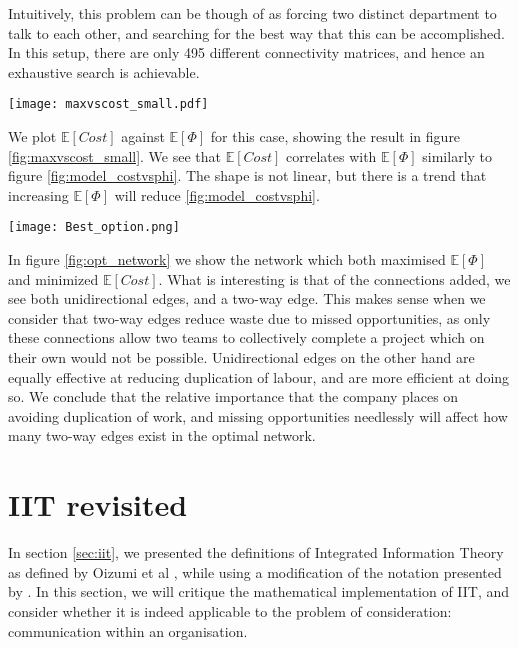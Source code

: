 Intuitively, this problem can be though of as forcing two distinct department to talk to each other, and searching for the best way that this can be accomplished. In this setup, there are only 495 different connectivity matrices, and hence an exhaustive search is achievable.



\begin{SCfigure}
	\centering
	\texttt{[image: maxvscost\_small.pdf]}
	\caption{We plot  $\mathbb{E}[Cost]$ against $\mathbb{E}[\Phi]$ for connectivity matrices where we add 4 directed edges to the network shown in figure \ref{fig:diagram2}}
	\label{fig:maxvscost_small}
\end{SCfigure}

We plot $\mathbb{E}[Cost]$ against $\mathbb{E}[\Phi]$ for this case, showing the result in figure \ref{fig:maxvscost_small}. We see that $\mathbb{E}[Cost]$ correlates with $\mathbb{E}[\Phi]$ similarly to figure \ref{fig:model_costvsphi}. The shape is not linear, but there is a trend that increasing $\mathbb{E}[\Phi]$ will reduce \ref{fig:model_costvsphi}.

\begin{SCfigure}
	\centering
	\texttt{[image: Best\_option.png]}
	\caption{We show the network which generated both the smallest $\mathbb{E}[Cost]$, and the largest $\mathbb{E}[\Phi]$. The two way link between $B$ and $D$ allows the network to have one combination of teams which can complete the project requiring all skills. The other one way links from $D$ affect results by minimizing duplication of work.}
	\label{fig:opt_network}
\end{SCfigure}

In figure \ref{fig:opt_network} we show the network which both maximised $\mathbb{E}[\Phi]$ and minimized $\mathbb{E}[Cost]$. What is interesting is that of the connections added, we see both unidirectional edges, and a two-way edge. This makes sense when we consider that two-way edges reduce waste due to missed opportunities, as only these connections allow two teams to collectively complete a project which on their own would not be possible. Unidirectional edges on the other hand are equally effective at reducing duplication of labour, and are more efficient at doing so. We conclude that the relative importance that the company places on avoiding duplication of work, and missing opportunities needlessly will affect how many two-way edges exist in the optimal network.


\section{IIT revisited}
In section \ref{sec:iit}, we presented the definitions of Integrated Information Theory as defined by Oizumi et al \cite{oizumi2014phenomenology}, while using a modification of the notation presented by \cite{krohn2016computing}. In this section, we will critique the mathematical implementation of IIT, and consider whether it is indeed applicable to the problem of consideration: communication within an organisation.


